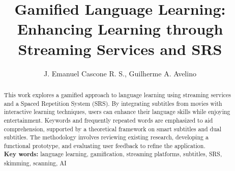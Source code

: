 \documentclass[12pt]{article}
\title{Gamified Language Learning: Enhancing Learning through Streaming Services and SRS}
\author{J. Emanuel Cascone R. S.\inst{1}, Guilherme A. Avelino\inst{1} }
\begin{document}
 

\maketitle

\begin{abstract} 
This work explores a gamified approach to language learning using streaming services and a Spaced Repetition System (SRS). By integrating subtitles from movies with interactive learning techniques, users can enhance their language skills while enjoying entertainment. Keywords and frequently repeated words are emphasized to aid comprehension, supported by a theoretical framework on smart subtitles and dual subtitles. The methodology involves reviewing existing research, developing a functional prototype, and evaluating user feedback to refine the application.\\
  \textbf{Key words:} language learning, gamification, streaming platforms, subtitles, SRS, skimming, scanning, AI
\end{abstract} 
\end{document}

